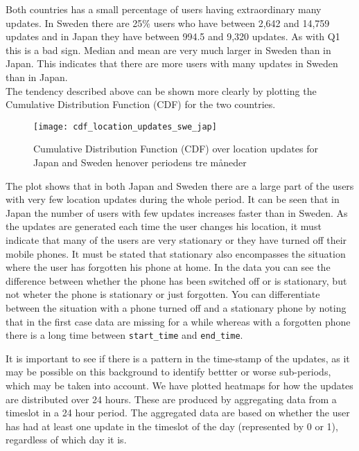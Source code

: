 Both countries has a small percentage of users having extraordinary many updates. In Sweden there are 25\% users who have between 2,642 and 14,759 updates and in Japan they have between 994.5 and 9,320 updates. As with Q1 this is a bad sign. 
Median and mean are very much larger in Sweden than in Japan. This indicates that there are more users with many updates in Sweden than in Japan.  \\

The tendency described above can be shown more clearly by plotting the Cumulative Distribution Function (CDF) for the two countries.  
 
\begin{figure}[H]
    \hspace*{-1.0cm}
    \centering
    \texttt{[image: cdf\_location\_updates\_swe\_jap]}
    \caption{Cumulative Distribution Function (CDF) over location updates for Japan and Sweden henover periodens tre måneder}
    \label{fig:country_cdf}
\end{figure}

The plot shows that in both Japan and Sweden there are a large part of the users with very few location updates during the whole period. It can be seen that in Japan the number of users with few updates increases faster than in Sweden.  
As the updates are generated each time the user changes his location, it must indicate that many of the users are very stationary or they have turned off their mobile phones. It must be stated that stationary also encompasses the situation where the user has forgotten his phone at home. In the data you can see the difference between whether the phone has been switched off or is stationary, but not wheter the phone is stationary or just forgotten. You can differentiate between the situation with a phone turned off and a stationary phone by noting that in the first case data are missing for a while whereas with a forgotten phone there is a long time between \texttt{start\_time} and \texttt{end\_time}.  

It is important to see if there is a pattern in the time-stamp of the updates, as it may be possible on this background to identify bettter or worse sub-periods, which may be taken into account. 
We have plotted heatmaps for how the updates are distributed over 24 hours. These are produced by aggregating data from a timeslot in a 24 hour period. The aggregated data are based on whether the user has had at least one update in the timeslot of the day (represented by 0 or 1), regardless of which day it is. 

